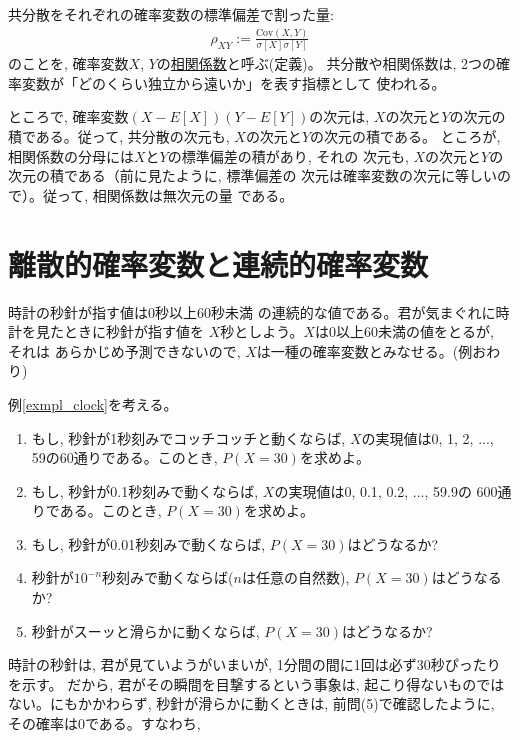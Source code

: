 共分散をそれぞれの確率変数の標準偏差で割った量:
\begin{eqnarray}
\rho_{XY}:=\frac{\text{Cov}(X, Y)}{\sigma[X]\sigma[Y]}\label{eq:def_corrcoef}
\end{eqnarray}
のことを, 確率変数$X$, $Y$の\underline{相関係数}と呼ぶ(定義)。
共分散や相関係数は, 2つの確率変数が「どのくらい独立から遠いか」を表す指標として
使われる。\mv

ところで, 確率変数$(X-E[X])(Y-E[Y])$の次元は, 
$X$の次元と$Y$の次元の積である。従って, 
共分散の次元も, $X$の次元と$Y$の次元の積である。
ところが, 相関係数の分母には$X$と$Y$の標準偏差の積があり, それの
次元も, $X$の次元と$Y$の次元の積である（前に見たように, 標準偏差の
次元は確率変数の次元に等しいので）。従って, 相関係数は無次元の量
である。\vv


\section{離散的確率変数と連続的確率変数}

\begin{exmpl}\label{exmpl_clock} 時計の秒針が指す値は0秒以上60秒未満
の連続的な値である。君が気まぐれに時計を見たときに秒針が指す値を
$X$秒としよう。$X$は0以上60未満の値をとるが, それは
あらかじめ予測できないので, $X$は一種の確率変数とみなせる。(例おわり)\end{exmpl}

\begin{q}\label{q:stat_clock_sec} 例\ref{exmpl_clock}を考える。
\begin{enumerate}
\item もし, 秒針が1秒刻みでコッチコッチと動くならば, 
$X$の実現値は0, 1, 2, ..., 59の60通りである。このとき, $P(X=30)$を求めよ。
\item もし, 秒針が0.1秒刻みで動くならば, $X$の実現値は0, 0.1, 0.2, ..., 59.9の
600通りである。このとき, $P(X=30)$を求めよ。
\item もし, 秒針が0.01秒刻みで動くならば, $P(X=30)$はどうなるか?
\item 秒針が$10^{-n}$秒刻みで動くならば($n$は任意の自然数), $P(X=30)$はどうなるか?
\item 秒針がスーッと滑らかに動くならば, $P(X=30)$はどうなるか?
\end{enumerate}
\end{q}

時計の秒針は, 君が見ていようがいまいが, 1分間の間に1回は必ず30秒ぴったりを示す。
だから, 君がその瞬間を目撃するという事象は, 起こり得ないものではない。にもかかわらず, 
秒針が滑らかに動くときは, 前問(5)で確認したように, その確率は0である。すなわち, 

